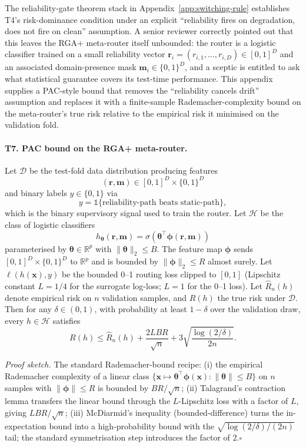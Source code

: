 \documentclass[11pt]{article}
\begin{document}
The reliability-gate theorem stack in Appendix~\ref{app:switching-rule}
establishes T4's risk-dominance condition under an explicit
``reliability fires on degradation, does not fire on clean'' assumption.
A senior reviewer correctly pointed out that this leaves the RGA+
meta-router itself unbounded: the router is a logistic classifier
trained on a small reliability vector
$\mathbf{r}_i=(r_{i,1},\dots,r_{i,D})\in[0,1]^D$ and an associated
domain-presence mask $\mathbf{m}_i\in\{0,1\}^D$, and a sceptic is
entitled to ask what statistical guarantee covers its test-time
performance. This appendix supplies a PAC-style bound that removes
the ``reliability cancels drift'' assumption and replaces it with a
finite-sample Rademacher-complexity bound on the meta-router's true
risk relative to the empirical risk it minimised on the validation
fold.

\paragraph{T7. PAC bound on the RGA+ meta-router.}
Let $\mathcal{D}$ be the test-fold data distribution producing features
\[
(\mathbf{r},\mathbf{m})\in[0,1]^{D}\times\{0,1\}^{D}
\]
and binary labels $y\in\{0,1\}$ via
\[
y=\mathbb{1}\{\text{reliability-path beats static-path}\},
\]
which is the binary supervisory signal used to train the router. Let
$\mathcal{H}$ be the class of logistic classifiers
\[
h_{\boldsymbol{\theta}}(\mathbf{r},\mathbf{m})=
\sigma\!\left(
\boldsymbol{\theta}^{\top}\boldsymbol{\phi}(\mathbf{r},\mathbf{m})
\right)
\]
parameterised by $\boldsymbol{\theta}\in\mathbb{R}^{p}$ with
$\|\boldsymbol{\theta}\|_2\leq B$. The feature map
$\boldsymbol{\phi}$ sends
$[0,1]^D\times\{0,1\}^D$ to $\mathbb{R}^{p}$ and is bounded by
$\|\boldsymbol{\phi}\|_2\leq R$ almost surely. Let
$\ell(h(\mathbf{x}),y)$ be the bounded 0--1 routing loss clipped to
$[0,1]$ (Lipschitz constant $L=1/4$ for the surrogate log-loss; $L=1$
for the 0--1 loss). Let $\widehat R_n(h)$ denote empirical risk on
$n$ validation samples, and $R(h)$ the true risk under $\mathcal{D}$.
Then for any $\delta\in(0,1)$, with probability at least $1-\delta$
over the validation draw, every $h\in\mathcal{H}$ satisfies
\[
  R(h)\leq\widehat R_n(h)+
  \frac{2LBR}{\sqrt{n}}+
  3\sqrt{\frac{\log(2/\delta)}{2n}}.
\]

\emph{Proof sketch.} The standard Rademacher-bound recipe: (i) the
empirical Rademacher complexity of a linear class
$\{\mathbf{x}\mapsto\boldsymbol{\theta}^{\top}\boldsymbol{\phi}(\mathbf{x}):
\|\boldsymbol{\theta}\|\leq B\}$ on $n$ samples with
$\|\boldsymbol{\phi}\|\leq R$ is bounded by $BR/\sqrt{n}$;
(ii) Talagrand's contraction lemma transfers the linear bound through
the $L$-Lipschitz loss with a factor of $L$, giving $LBR/\sqrt{n}$;
(iii) McDiarmid's inequality (bounded-difference) turns the
in-expectation bound into a high-probability bound with the
$\sqrt{\log(2/\delta)/(2n)}$ tail; the standard symmetrisation step
introduces the factor of $2$.\hfill$\square$
\end{document}
